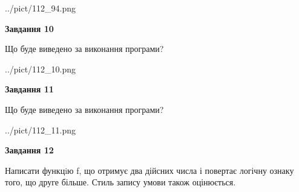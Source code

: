 \documentclass[12pt, ukrainian]{article}
\begin{document}
{\begin {large}
\begin{center}
	{../pict/112_94.png}
\end{center}
\newpage

{\begin {center}\textbf{Завдання 10}\end {center}}

Що буде виведено за виконання програми?\par
\begin{center}
	{../pict/112_10.png}
\end{center}
\newpage

{\begin {center}\textbf{Завдання 11}\end {center}}

Що буде виведено за виконання програми?\par
\begin{center}
	{../pict/112_11.png}
\end{center}
\newpage

{\begin {center}\textbf{Завдання 12}\end {center}}


Написати функцiю f, що отримує два дійсних числа і повертає логічну ознаку того, що друге більше. Стиль запису умови також оцінюється.\par
\newpage

\end {large}}
\end{document}

